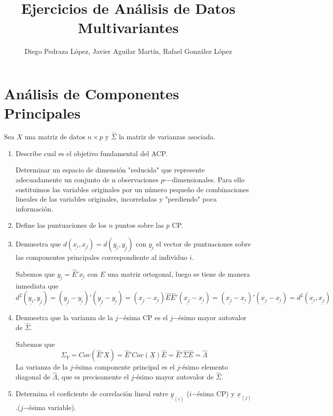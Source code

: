 \documentclass[twoside]{article}
\newcommand{\muestra}[1]{{\underline{#1}}}
\begin{document}
\title{Ejercicios de Análisis de Datos Multivariantes}
\author{Diego Pedraza López, Javier Aguilar Martín, Rafael González López}
\maketitle

\section{Análisis de Componentes Principales}
Sea $X$ una matriz de datos $n \times p$ y $\widehat{\Sigma}$ la matriz de varianzas asociada.

\begin{enumerate}
\item Describe cual es el objetivo fundamental del ACP.

Determinar un espacio de dimensión "reducida" que represente adecuadamente un conjunto de n observaciones $p$-−dimensionales. Para ello sustituimos las variables originales por un número pequeño de combinaciones lineales de las variables originales, incorreladas y "perdiendo" poca información.

\item Define las puntuaciones de los $n$ puntos sobre las $p$ CP. 
\item Demuestra que $d(\muestra{x_i}, \muestra{x_j}) = d(\muestra{y_i}, \muestra{y_j})$ con $\muestra{y_i}$ el vector de puntuaciones sobre las componentes principales correspondiente al individuo $i$. 

Sabemos que $\muestra{y_i} = \hat{E}'\muestra{x_i}$ con $E$ una matriz ortogonal, luego se tiene de manera inmediata que 
$$
d^2(\muestra{y_i},\muestra{y_j})=(\muestra{y_j}-\muestra{y_i})'(\muestra{y_j}-\muestra{y_i}) = (\muestra{x_j}-\muestra{x_i})\hat{E}\hat{E}'(\muestra{x_j}-\muestra{x_i}) = (\muestra{x_j}-\muestra{x_i}) '(\muestra{x_j}-\muestra{x_i}) = d^2(\muestra{x_i},\muestra{x_j})
$$
\item Demuestra que la varianza de la $j$−ésima CP es el $j$−ésimo mayor autovalor de $\widehat{\Sigma}$.

Sabemos que $$\Sigma_{\muestra{Y}} = Cov(\hat{E}'\muestra{X})= \hat{E}'Cov(\muestra{X})\hat{E} =\hat{E}' \hat{\Sigma}\hat{E}= \hat{\Lambda}$$
La varianza de la $j$-ésima componente principal es el $j$-ésimo elemento diagonal de $\hat{\Lambda}$, que es precisamente el $j$-ésimo mayor autovalor de $\hat{\Sigma}$.

\item Determina el coeficiente de correlación lineal entre $\muestra{y}_{{(i)}}$ ($i$−ésima CP) y $\muestra{x}_{(j)}$ .($j$−ésima variable).


\end{enumerate}
\end{document}
